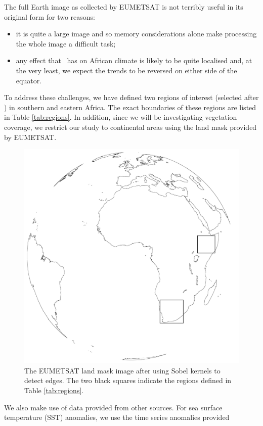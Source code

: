 The full Earth image as collected by EUMETSAT is not terribly useful
in its original form for two reasons:
\begin{itemize}
  \item{it is quite a large
    image and so memory considerations alone make processing the whole
    image a difficult task;}
  \item{any effect that \elnino\ has on African climate is likely to be
    quite localised and, at the very least, we expect the trends to be
    reversed on either side of the equator.}
\end{itemize}
To address these challenges, we have defined two regions of interest
(selected after \cite{anyamba1996, anyamba2002}) in southern and
eastern Africa. The exact boundaries of these regions are listed in
Table \ref{tab:regions}. In addition, since we will be investigating
vegetation coverage, we restrict our study to continental areas using
the land mask provided by EUMETSAT.
\begin{figure}
  \centering
  \includegraphics[width=0.9\linewidth]{figures/regions_figure}
  \caption{The EUMETSAT land mask image after using Sobel kernels to
    detect edges. The two black squares indicate the regions defined
    in Table \ref{tab:regions}.}
  \label{fig:regions}
\end{figure}
We also make use of data provided from other sources. For sea surface
temperature (SST) anomalies, we use the time series anomalies provided
